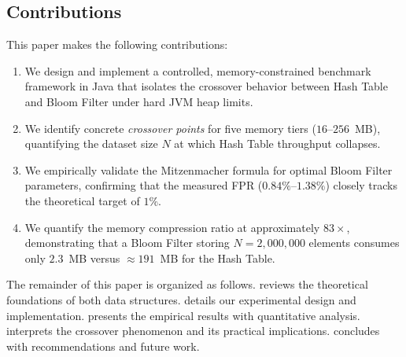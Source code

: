 \subsection{Contributions}

This paper makes the following contributions:

\begin{enumerate}[leftmargin=*, label=\arabic*.]
    \item We design and implement a controlled, memory-constrained benchmark framework in Java that isolates the crossover behavior between Hash Table and Bloom Filter under hard JVM heap limits.
    \item We identify concrete \emph{crossover points} for five memory tiers ($16$--$256$~MB), quantifying the dataset size $N$ at which Hash Table throughput collapses.
    \item We empirically validate the Mitzenmacher formula for optimal Bloom Filter parameters, confirming that the measured FPR ($0.84\%$--$1.38\%$) closely tracks the theoretical target of $1\%$.
    \item We quantify the memory compression ratio at approximately $83\times$, demonstrating that a Bloom Filter storing $N = 2{,}000{,}000$ elements consumes only $2.3$~MB versus ${\approx}191$~MB for the Hash Table.
\end{enumerate}

The remainder of this paper is organized as follows.  reviews the theoretical foundations of both data structures.  details our experimental design and implementation.  presents the empirical results with quantitative analysis.  interprets the crossover phenomenon and its practical implications.  concludes with recommendations and future work.
